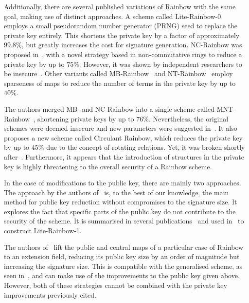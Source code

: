 \documentclass[draft, 12pt, a4paper, oneside]{memoir}
\begin{document}
Additionally, there are several published variations of Rainbow with the
same goal, making use of distinct approaches. A scheme called
Lite-Rainbow-0~\cite{Shim:201512:inproc} employs a small pseudorandom
number generator (PRNG) seed to replace the private key entirely. This shortens
the private key by a factor of approximately $99.8\%$, but greatly increases
the cost for signature generation. NC-Rainbow was proposed
in~\cite{Yasuda:201202:inproc}, with a novel strategy based in non-commutative
rings to reduce a private key by up to $75\%$. However, it was shown by
independent researchers to be
insecure~\cite{Thomae:201209:inproc,Hashimoto:201302:inproc}. Other variants
called MB-Rainbow~\cite{Yasuda:201305:inproc} and
NT-Rainbow~\cite{Yasuda:201404:inproc} employ sparseness of maps to reduce the
number of terms in the private key by up to $40\%$.

The authors merged MB- and NC-Rainbow into a single scheme called
MNT-Rainbow~\cite{Yasuda:201409:article}, shortening private keys by up to
$76\%$. Nevertheless, the original schemes were deemed insecure and new
parameters were suggested in~\cite{Peng:201706:article}. It also proposes a new
scheme called Circulant Rainbow, which reduces the private key by up to $45\%$
due to the concept of rotating relations. Yet, it was broken shortly
after~\cite{Hashimoto:201810:misc}. Furthermore, it appears that the introduction
of structures in the private key is highly threatening to the overall security 
of a Rainbow scheme.

In the case of modifications to the public key, there are mainly two approaches.
The approach by the authors of~\cite{Petzoldt:201006:inproc} is, to the best of 
our knowledge, the main method for public key reduction without compromises to
the signature size. It explores the fact that specific parts of the public key
do not contribute to the security of the scheme. It is summarised in several
publications~\cite{Petzoldt:201012:inproc,Petzoldt:201103:inproc,Petzoldt:201211:inproc,Petzoldt:201307:phd}
and used in~\cite{Shim:201512:inproc} to construct Lite-Rainbow-1.

The authors of~\cite{Szepieniec:201706:inproc} lift the public and central maps
of a particular case of Rainbow to an extension field, reducing its public 
key size by an order of magnitude but increasing the signature size. This is 
compatible with the generalised scheme, as seen in~\cite{Beullens:201706:msc,Beullens:201712:inproc},
and can make use of the improvements to the public key given above. However,
both of these strategies cannot be combined with the private key improvements
previously cited. 
\end{document}

